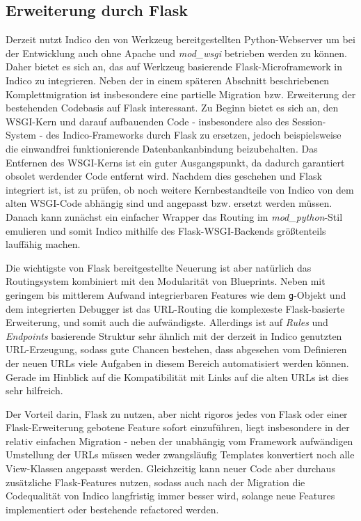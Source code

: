 \subsection{Erweiterung durch Flask}\label{migration-flask-partial}
Derzeit nutzt Indico den von Werkzeug bereitgestellten Python-Webserver um bei der Entwicklung auch
ohne Apache und \emph{mod\_wsgi} betrieben werden zu können. Daher bietet es sich an, das auf
Werkzeug basierende Flask-Microframework in Indico zu integrieren. Neben der in einem späteren
Abschnitt beschriebenen Komplettmigration ist insbesondere eine partielle Migration bzw. Erweiterung
der bestehenden Codebasis auf Flask interessant. Zu Beginn bietet es sich an, den WSGI-Kern und
darauf aufbauenden Code - insbesondere also des Session-System - des Indico-Frameworks durch Flask
zu ersetzen, jedoch beispielsweise die einwandfrei funktionierende Datenbankanbindung beizubehalten.
Das Entfernen des WSGI-Kerns ist ein guter Ausgangspunkt, da dadurch garantiert obsolet werdender
Code entfernt wird. Nachdem dies geschehen und Flask integriert ist, ist zu prüfen, ob noch weitere
Kernbestandteile von Indico von dem alten WSGI-Code abhängig sind und angepasst bzw. ersetzt werden
müssen. Danach kann zunächst ein einfacher Wrapper das Routing im \emph{mod\_python}-Stil emulieren
und somit Indico mithilfe des Flask-WSGI-Backends größtenteils lauffähig machen.

Die wichtigste von Flask bereitgestellte Neuerung ist aber natürlich das Routingsystem kombiniert
mit den Modularität von Blueprints. Neben mit geringem bis mittlerem Aufwand integrierbaren Features
wie dem \lstinline{g}-Objekt und dem integrierten Debugger ist das URL-Routing die komplexeste
Flask-basierte Erweiterung, und somit auch die aufwändigste. Allerdings ist auf \emph{Rules} und
\emph{Endpoints} basierende Struktur sehr ähnlich mit der derzeit in Indico genutzten URL-Erzeugung,
sodass gute Chancen bestehen, dass abgesehen vom Definieren der neuen URLs viele Aufgaben in diesem
Bereich automatisiert werden können. Gerade im Hinblick auf die Kompatibilität mit Links auf die
alten URLs ist dies sehr hilfreich.

Der Vorteil darin, Flask zu nutzen, aber nicht rigoros jedes von Flask oder einer Flask-Erweiterung
gebotene Feature sofort einzuführen, liegt insbesondere in der relativ einfachen Migration - neben
der unabhängig vom Framework aufwändigen Umstellung der URLs müssen weder zwangsläufig Templates
konvertiert noch alle View-Klassen angepasst werden. Gleichzeitig kann neuer Code aber durchaus
zusätzliche Flask-Features nutzen, sodass auch nach der Migration die Codequalität von Indico
langfristig immer besser wird, solange neue Features implementiert oder bestehende refactored
werden.


